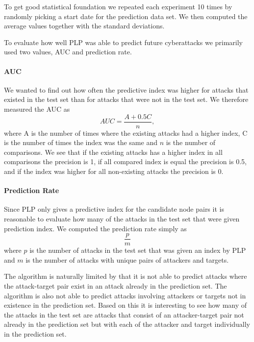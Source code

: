 To get good statistical foundation we repeated each experiment 10 times by randomly picking a start date for the prediction data set. We then computed the average values together with the standard deviations.

To evaluate how well PLP was able to predict future cyberattacks we primarily used two values, AUC and prediction rate.

\paragraph{AUC}\label{plp:auc}
We wanted to find out how often the predictive index was higher for attacks that existed in the test set than for attacks that were not in the test set. We therefore measured the AUC as
$$
  AUC = \frac{A+0.5C}{n},
$$
where A is the number of times where the existing attacks had a higher index, C is the number of times the index was the same and $n$ is the number of comparisons. We see that if the existing attacks has a higher index in all comparisons the precision is 1, if all compared index is equal the precision is 0.5, and if the index was higher for all non-existing attacks the precision is 0.

\paragraph{Prediction Rate}\label{plp:predict_rate}
Since PLP only gives a predictive index for the candidate node pairs it is reasonable to evaluate how many of the attacks in the test set that were given prediction index. We computed the prediction rate simply as
$$
  \frac{p}{m}
$$
where $p$ is the number of attacks in the test set that was given an index by PLP and $m$ is the number of attacks with unique pairs of attackers and targets.

The algorithm is naturally limited by that it is not able to predict attacks where the attack-target pair exist in an attack already in the prediction set. The algorithm is also not able to predict attacks involving attackers or targets not in existence in the prediction set. Based on this it is interesting to see how many of the attacks in the test set are attacks that consist of an attacker-target pair not already in the prediction set but with each of the attacker and target individually in the prediction set.
